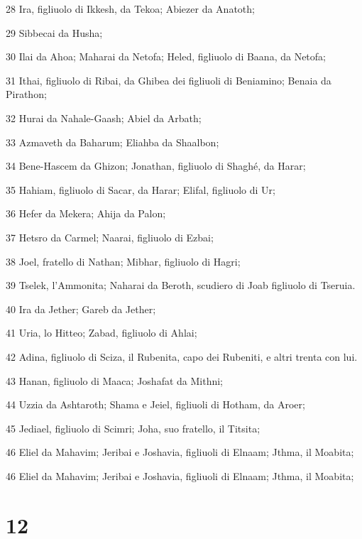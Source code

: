 \par 28 Ira, figliuolo di Ikkesh, da Tekoa; Abiezer da Anatoth;
\par 29 Sibbecai da Husha;
\par 30 Ilai da Ahoa; Maharai da Netofa; Heled, figliuolo di Baana, da Netofa;
\par 31 Ithai, figliuolo di Ribai, da Ghibea dei figliuoli di Beniamino; Benaia da Pirathon;
\par 32 Hurai da Nahale-Gaash; Abiel da Arbath;
\par 33 Azmaveth da Baharum; Eliahba da Shaalbon;
\par 34 Bene-Hascem da Ghizon; Jonathan, figliuolo di Shaghé, da Harar;
\par 35 Hahiam, figliuolo di Sacar, da Harar; Elifal, figliuolo di Ur;
\par 36 Hefer da Mekera; Ahija da Palon;
\par 37 Hetsro da Carmel; Naarai, figliuolo di Ezbai;
\par 38 Joel, fratello di Nathan; Mibhar, figliuolo di Hagri;
\par 39 Tselek, l'Ammonita; Naharai da Beroth, scudiero di Joab figliuolo di Tseruia.
\par 40 Ira da Jether; Gareb da Jether;
\par 41 Uria, lo Hitteo; Zabad, figliuolo di Ahlai;
\par 42 Adina, figliuolo di Sciza, il Rubenita, capo dei Rubeniti, e altri trenta con lui.
\par 43 Hanan, figliuolo di Maaca; Joshafat da Mithni;
\par 44 Uzzia da Ashtaroth; Shama e Jeiel, figliuoli di Hotham, da Aroer;
\par 45 Jediael, figliuolo di Scimri; Joha, suo fratello, il Titsita;
\par 46 Eliel da Mahavim; Jeribai e Joshavia, figliuoli di Elnaam; Jthma, il Moabita;
\par 46 Eliel da Mahavim; Jeribai e Joshavia, figliuoli di Elnaam; Jthma, il Moabita;

\chapter{12}

